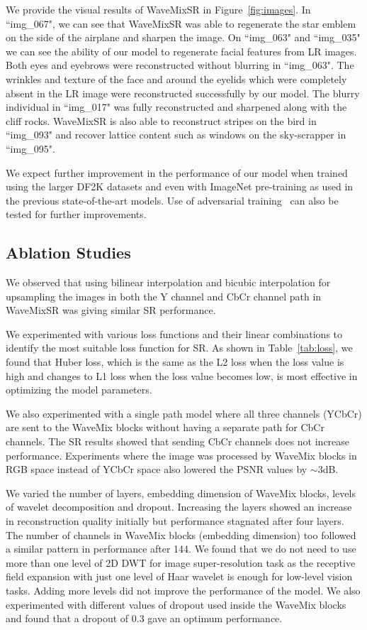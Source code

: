 \documentclass{article}
\begin{document}
We provide the visual results of WaveMixSR in Figure~\ref{fig:images}. In ``img\_067", we can see that WaveMixSR was able to regenerate the star emblem on the side of the airplane and sharpen the image. On ``img\_063" and ``img\_035" we can see the ability of our model to regenerate facial features from LR images. Both eyes and eyebrows were reconstructed without blurring in ``img\_063". The wrinkles and texture of the face and  around the eyelids which were completely absent in the LR image were reconstructed successfully by our model. The blurry individual in ``img\_017" was fully reconstructed and sharpened along with the cliff rocks. WaveMixSR is also able to reconstruct stripes on the bird in ``img\_093" and recover lattice content such as windows on the sky-scrapper in ``img\_095".

We expect further improvement in the performance of our model when trained using the larger DF2K datasets and even with ImageNet pre-training as used in the previous state-of-the-art models. Use of adversarial training~\cite{ledig2017photorealistic} can also be tested for further improvements.


\subsection{Ablation Studies}

We observed that using bilinear interpolation and bicubic interpolation for upsampling the images in both the Y channel and CbCr channel path in WaveMixSR was giving similar SR performance. 

We experimented with various loss functions and their linear combinations to identify the most suitable loss function for SR. As shown in Table~\ref{tab:loss}, we found that Huber loss, which is the same as the L2 loss when the loss value is high and changes to L1 loss when the loss value becomes low, is most effective in optimizing  the model parameters. 



We also experimented with a single path model where all three channels (YCbCr) are sent to the WaveMix blocks without having a separate path for CbCr channels. The SR results showed that sending CbCr channels does not increase performance. Experiments where the image was processed by WaveMix blocks in RGB space instead of YCbCr space also lowered the PSNR values by $\sim 3$dB. 

We varied the number of layers, embedding dimension of WaveMix blocks, levels of wavelet decomposition and dropout. Increasing the layers showed an increase in reconstruction quality initially but performance stagnated after four layers. The number of channels in WaveMix blocks (embedding dimension) too followed a similar pattern in performance after 144. We found that we do not need to use more than one level of 2D DWT for image super-resolution task as the receptive field expansion with just one level of Haar wavelet is enough for low-level vision tasks. Adding more levels did not improve the performance of the model. We also experimented with different values of dropout used inside the WaveMix blocks and found that a dropout of 0.3 gave an optimum performance.
\end{document}
